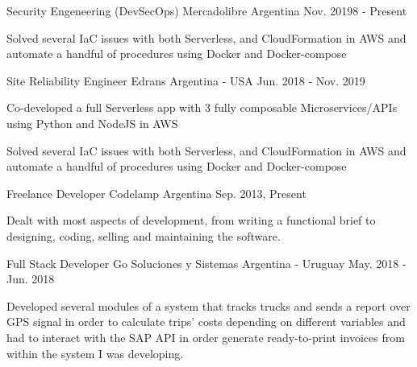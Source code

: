

\begin{cventries}
\cventry
{Security Engeneering (DevSecOps)} %
{Mercadolibre} %
{Argentina} %
{Nov. 20198 - Present} %
{
\begin{cvitems} %
\item {Solved several IaC issues with both Serverless, and CloudFormation in AWS and automate a handful of procedures using Docker and Docker-compose}
\end{cvitems}
}

\cventry
{Site Reliability Engineer} %
{Edrans} %
{Argentina - USA} %
{Jun. 2018 - Nov. 2019} %
{
\begin{cvitems} %
\item {Co-developed a full Serverless app with 3 fully composable Microservices/APIs using Python and NodeJS in AWS}
\item {Solved several IaC issues with both Serverless, and CloudFormation in AWS and automate a handful of procedures using Docker and Docker-compose}
\end{cvitems}
}

\cventry
{Freelance Developer} %
{Codelamp} %
{Argentina} %
{Sep. 2013, Present} %
{
\begin{cvitems}
    \item {Dealt with most aspects of development, from writing a functional brief to designing, coding, selling and maintaining the software.}
\end{cvitems}
}

\cventry
{Full Stack Developer} %
{Go Soluciones y Sistemas} %
{Argentina - Uruguay} %
{May. 2018 - Jun. 2018} %
{
\begin{cvitems} %
\item {Developed several modules of a system that tracks trucks and sends a report over GPS signal in order to calculate trips' costs depending on different variables and had to interact with the SAP API in order generate ready-to-print invoices from within the system I was developing.}
\end{cvitems}
}


\end{cventries}
